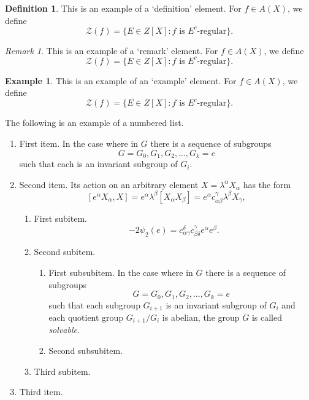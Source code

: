 \documentclass{amsart}
\theoremstyle{definition}
\newtheorem{definition}[theorem]{Definition}
\newtheorem{example}[theorem]{Example}
\theoremstyle{remark}
\newtheorem{remark}[theorem]{Remark}
\numberwithin{equation}{section}
\begin{document}
\begin{definition}
This is an example of a `definition' element.
For $f\in A(X)$, we define
\begin{equation}
\mathcal{Z} (f)=\{E\in Z[X]: \text{$f$ is $E^c$-regular}\}.
\end{equation}
\end{definition}

\begin{remark}
This is an example of a `remark' element.
For $f\in A(X)$, we define
\begin{equation}
\mathcal{Z} (f)=\{E\in Z[X]: \text{$f$ is $E^c$-regular}\}.
\end{equation}
\end{remark}

\begin{example}
This is an example of an `example' element.
For $f\in A(X)$, we define
\begin{equation}
\mathcal{Z} (f)=\{E\in Z[X]: \text{$f$ is $E^c$-regular}\}.
\end{equation}
\end{example}


The following is an example of a numbered list.

\begin{enumerate}
\item First item.
In the case where in $G$ there is a sequence of subgroups
\[
G = G_0, G_1, G_2, \dots, G_k = e
\]
such that each is an invariant subgroup of $G_i$.

\item Second item.
Its action on an arbitrary element $X = \lambda^\alpha X_\alpha$ has the
form
\begin{equation}\label{eq:action}
[e^\alpha X_\alpha, X] = e^\alpha \lambda^\beta
[X_\alpha X_\beta] = e^\alpha c^\gamma_{\alpha \beta}
 \lambda^\beta X_\gamma,
\end{equation}

\begin{enumerate}
\item First subitem.
\[
- 2\psi_2(e) =  c_{\alpha \gamma}^\delta c_{\beta \delta}^\gamma
e^\alpha e^\beta.
\]

\item Second subitem.
\begin{enumerate}
\item First subsubitem.
In the case where in $G$ there is a sequence of subgroups
\[
G = G_0, G_1, G_2, \ldots, G_k = e
\]
such that each subgroup $G_{i+1}$ is an invariant subgroup of $G_i$ and
each quotient group $G_{i+1}/G_{i}$ is abelian, the group $G$ is called
\textit{solvable}.

\item Second subsubitem.
\end{enumerate}
\item Third subitem.
\end{enumerate}
\item Third item.
\end{enumerate}
\end{document}
